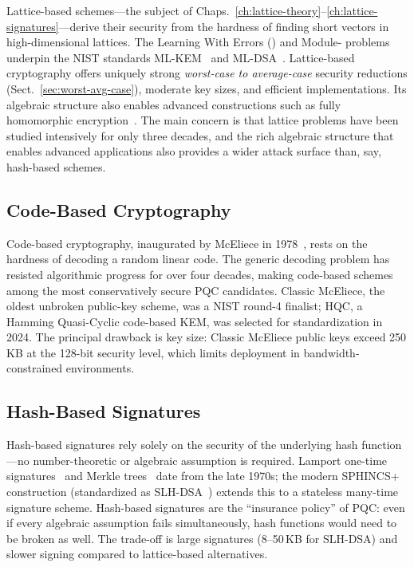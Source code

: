 Lattice-based schemes---the subject of Chaps.~\ref{ch:lattice-theory}--\ref{ch:lattice-signatures}---derive their security from the hardness of finding short vectors in high-dimensional lattices.  The Learning With Errors (\lwe{}) and Module-\lwe{} problems underpin the NIST standards ML-KEM~\cite{FIPS203} and ML-DSA~\cite{FIPS204}.  Lattice-based cryptography offers uniquely strong \emph{worst-case to average-case} security reductions (Sect.~\ref{sec:worst-avg-case}), moderate key sizes, and efficient implementations.  Its algebraic structure also enables advanced constructions such as fully homomorphic encryption~\cite{Gentry2009}.  The main concern is that lattice problems have been studied intensively for only three decades, and the rich algebraic structure that enables advanced applications also provides a wider attack surface than, say, hash-based schemes.

\subsection{Code-Based Cryptography}
\label{subsec:family-code}

Code-based cryptography, inaugurated by McEliece in 1978~\cite{McEliece1978}, rests on the hardness of decoding a random linear code.  The generic decoding problem has resisted algorithmic progress for over four decades, making code-based schemes among the most conservatively secure PQC candidates.  Classic McEliece, the oldest unbroken public-key scheme, was a NIST round-4 finalist; HQC, a Hamming Quasi-Cyclic code-based KEM, was selected for standardization in 2024.  The principal drawback is key size: Classic McEliece public keys exceed 250\,KB at the 128-bit security level, which limits deployment in bandwidth-constrained environments.

\subsection{Hash-Based Signatures}
\label{subsec:family-hash}

Hash-based signatures rely solely on the security of the underlying hash function---no number-theoretic or algebraic assumption is required.  Lamport one-time signatures~\cite{Lamport1979} and Merkle trees~\cite{Merkle1979} date from the late 1970s; the modern SPHINCS+ construction (standardized as SLH-DSA~\cite{FIPS205}) extends this to a stateless many-time signature scheme.  Hash-based signatures are the ``insurance policy'' of PQC: even if every algebraic assumption fails simultaneously, hash functions would need to be broken as well.  The trade-off is large signatures (8--50\,KB for SLH-DSA) and slower signing compared to lattice-based alternatives.

